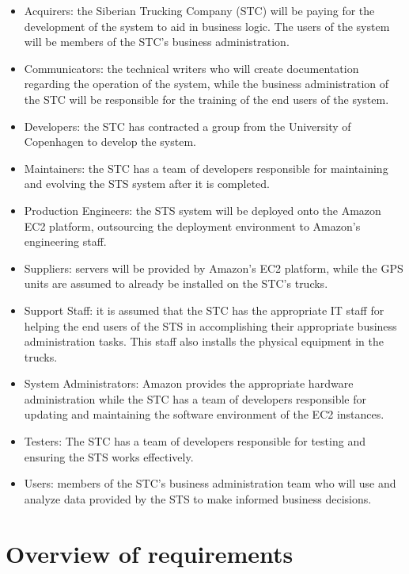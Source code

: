 \documentclass[a4paper,11pt]{report}
\begin{document}
\begin{itemize}
  \item Acquirers: the Siberian Trucking Company (STC) will be paying for the
    development of the system to aid in business logic. The users of the system
    will be members of the STC's business administration.
  \item Communicators: the technical writers who will create documentation regarding the
    operation of the system, while the business administration of the STC will
    be responsible for the training of the end users of the system.
  \item Developers: the STC has contracted a group from the University of
    Copenhagen to develop the system.
  \item Maintainers: the STC has a team of developers responsible for
    maintaining and evolving the STS system after it is completed.
  \item Production Engineers: the STS system will be deployed onto the Amazon
    EC2 platform, outsourcing the deployment environment to Amazon's
    engineering staff.
  \item Suppliers: servers will be provided by Amazon's EC2 platform, while the
    GPS units are assumed to already be installed on the STC's trucks.
  \item Support Staff: it is assumed that the STC has the appropriate IT staff
    for helping the end users of the STS in accomplishing their appropriate
    business administration tasks. This staff also installs the physical equipment in the trucks.
  \item System Administrators: Amazon provides the appropriate hardware
    administration while the STC has a team of developers responsible for
    updating and maintaining the software environment of the EC2 instances.
  \item Testers: The STC has a team of developers responsible for testing and
    ensuring the STS works effectively.
  \item Users: members of the STC's business administration team who will use
    and analyze data provided by the STS to make informed business decisions.
\end{itemize}

\section{Overview of requirements}
\label{sec:overv-requ}
\end{document}

